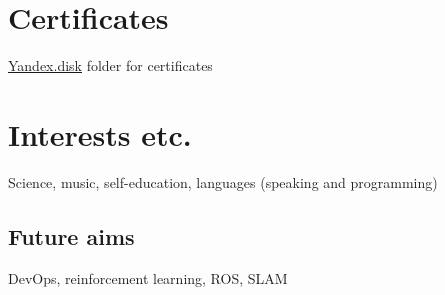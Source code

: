 \documentclass[letterpaper]{twentysecondcv} %
\begin{document}

\section{Certificates}

\href{https://yadi.sk/d/aSyzcZ44-_l-8w?w=1}{Yandex.disk} folder for certificates

\section{Interests etc.}

Science, music, self-education, languages (speaking and programming)

\subsection{Future aims}

DevOps, reinforcement learning, ROS, SLAM







\end{document}
